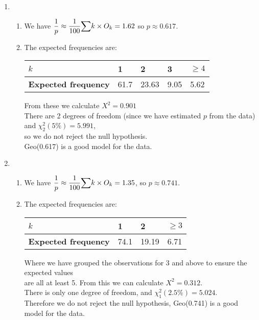\documentclass[fleqn]{article}
\begin{document}
\begin{enumerate}
    \newpage
    \item \begin{enumerate}[label=\bfseries \alph*\space ]
            \item We have $\dfrac{1}{p}\approx\dfrac{1}{100}{\mathlarger\sum}k\times O_k=1.62$ so $p\approx 0.617$.
            \item The expected frequencies are:  \vspace{1mm}\\
                \begin{tabularx}{0.55\textwidth}{|X|*4{P{12mm}|}}
                    \hline
                    \textbf{$k$}                 & 1     & 2     & 3    & $\geq 4$   \\\hline
                    \textbf{Expected frequency}  & 61.7  & 23.63 & 9.05 & 5.62       \\\hline
                \end{tabularx}\vspace{4mm}
                
                From these we calculate $X^2=0.901$\\
                There are 2 degrees of freedom (since we have estimated $p$ from the data) and $\chi_2^2(5\%)=5.991$, \\
                so we do not reject the null hypothesis. \\
                Geo(0.617) is a good model for the data.
        \end{enumerate}
    
    \item \begin{enumerate}[label=\bfseries \alph*\space ]
            \item We have $\dfrac{1}{p}\approx\dfrac{1}{100}{\mathlarger\sum}k\times O_k=1.35$, so $p \approx 0.741$.
            \item The expected frequencies are: \vspace{1mm}\\
                \begin{tabularx}{0.47\textwidth}{|X|*3{P{12mm}|}}
                    \hline
                    \textbf{$k$}                 & 1     & 2     & $\geq 3$   \\\hline
                    \textbf{Expected frequency}  & 74.1  & 19.19 & 6.71       \\\hline
                \end{tabularx}\vspace{4mm}
                
                Where we have grouped the observations for 3 and above to ensure the expected values \\
                are all at least 5. From this we can calculate $X^2=0.312$. \\
                There is only one degree of freedom, and $\chi_1^2(2.5\%)=5.024$.\\
                Therefore we do not reject the null hypothesis, Geo(0.741) is a good model for the data.
        \end{enumerate}
\end{enumerate}
\end{document}
